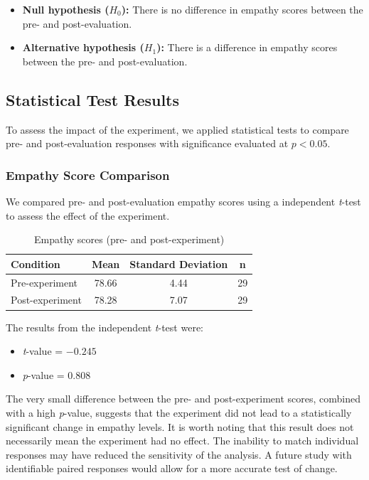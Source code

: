 \begin{itemize}
  \item \textbf{Null hypothesis ($H_0$):} There is no difference in empathy scores between the pre- and post-evaluation.
  \item \textbf{Alternative hypothesis ($H_1$):} There is a difference in empathy scores between the pre- and post-evaluation.
\end{itemize}


\subsection{Statistical Test Results}

To assess the impact of the experiment, we applied statistical tests to compare pre- and post-evaluation responses with significance evaluated at $p < 0.05$.

\subsubsection{Empathy Score Comparison}

We compared pre- and post-evaluation empathy scores using a independent \textit{t}-test to assess the effect of the experiment.

\begin{table}[htbp]
    \centering
    \caption{Empathy scores (pre- and post-experiment)}
    \begin{tabular}{|l|c|c|c|}
        \hline
        \textbf{Condition} & \textbf{Mean} & \textbf{Standard Deviation} & \textbf{n} \\
        \hline
        Pre-experiment & 78.66 & 4.44 & 29 \\
        \hline
        Post-experiment & 78.28 & 7.07 & 29 \\
        \hline
    \end{tabular}
    \label{tab:group_empathy_stats}
\end{table}

The results from the independent \textit{t}-test were:

\begin{itemize}
    \item \textit{t}-value = \(-0.245\)
    \item \textit{p}-value = \(0.808\)
\end{itemize}

The very small difference between the pre- and post-experiment scores, combined with a high \textit{p}-value, suggests that the experiment did not lead to a statistically significant change in empathy levels. It is worth noting that this result does not necessarily mean the experiment had no effect. The inability to match individual responses may have reduced the sensitivity of the analysis. A future study with identifiable paired responses would allow for a more accurate test of change.


